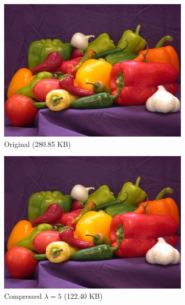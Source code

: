 \documentclass[12pt]{article}
\theoremstyle{definition}
\begin{document}
  \begin{figure}
    \centering
    \begin{subfigure}[t]{.49\linewidth}
      \centering
      \includegraphics[trim={0 0 3.7in 2.8in},clip]{figs/peppers.png}
      \caption{Original (280.85 KB)}
    \end{subfigure}
    \begin{subfigure}[t]{.49\linewidth}
      \centering
      \includegraphics[trim={0 0 3.7in 2.8in},clip]{figs/peppers_haar_5.png}
      \caption{Compressed \(\lambda = 5\) (122.40 KB)}
    \end{subfigure}
    \begin{subfigure}[t]{.49\linewidth}
      \centering

\end{subfigure}
\end{figure}
\end{document}
